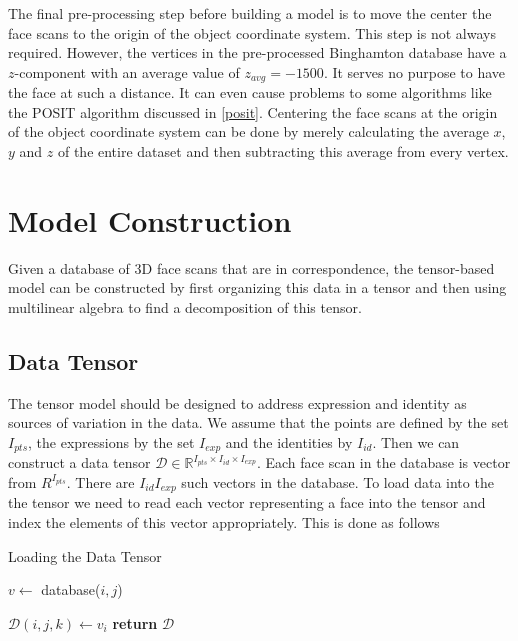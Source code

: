 \documentclass[11pt,a4paper]{report}
\begin{document}
The final pre-processing step before building a model is to move the center the
face scans to the origin of the object coordinate system. This step is not always required. However, the vertices in the
pre-processed Binghamton database have a $z$-component with an average value of
$z_{avg}=-1500$. It serves no purpose to have the face at such a distance. It
can even cause problems to some algorithms like the POSIT algorithm discussed in
\ref{posit}. Centering the face scans at the origin of the object coordinate
system can be done by merely calculating the average $x$, $y$ and $z$ of the
entire dataset and then subtracting this average from every vertex.


\section{Model Construction}
Given a database of 3D face scans that are in correspondence, the tensor-based
model can be constructed by first organizing this data in a tensor and
then using multilinear algebra to find a decomposition of this tensor.

\subsection{Data Tensor}\label{s:datatesnor}
The tensor model should be designed to address expression and identity as sources of variation in
the data. We assume that the points are defined by the set $I_{pts}$, the
expressions by the set $I_{exp}$ and the identities by $I_{id}$. Then we can
construct a data tensor $\mathcal{D} \in \mathbb{R}^{I_{pts} \times I_{id}
  \times I_{exp}}$. Each face scan in the database is vector from
$R^{I_{pts}}$. There are $I_{id}I_{exp}$ such vectors in the database. To load data into the the tensor we need to read each vector
representing a face into the tensor and index the elements of this vector
appropriately. This is done as follows

\begin{algorithm}\label{a:load}
\caption{Loading the Data Tensor}
\begin{algorithmic}[1]
 

\State $v \gets $ database($i,j$)


\State $\mathcal{D}(i,j,k) \gets v_i $
\EndFor
\EndFor
\EndFor
\State \textbf{return} $\mathcal{D}$ 
\EndProcedure
\end{algorithmic}
\end{algorithm}
\end{document}
